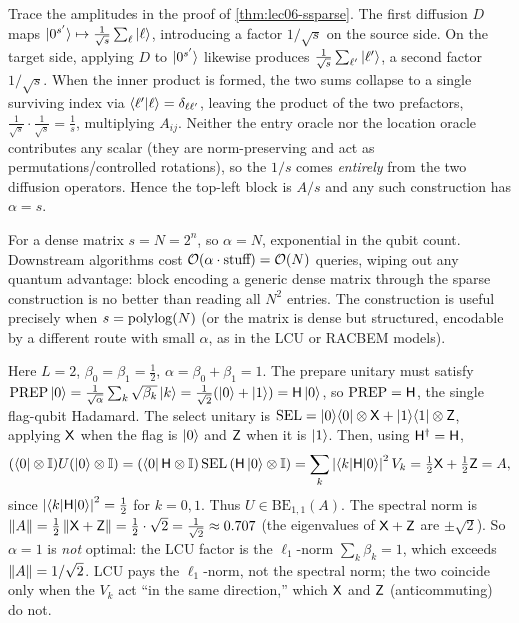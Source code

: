 \begin{solution}
Trace the amplitudes in the proof of \cref{thm:lec06-ssparse}. The first diffusion
$D$ maps $\ket{0^{s'}}\mapsto\frac{1}{\sqrt s}\sum_\ell\ket{\ell}$, introducing a
factor $1/\sqrt s$ on the source side. On the target side, applying $D$ to
$\ket{0^{s'}}$ likewise produces $\frac{1}{\sqrt s}\sum_{\ell'}\ket{\ell'}$, a second
factor $1/\sqrt s$. When the inner product is formed, the two sums collapse to a
single surviving index via $\braket{\ell'|\ell}=\delta_{\ell\ell'}$, leaving the
product of the two prefactors, $\frac{1}{\sqrt s}\cdot\frac{1}{\sqrt s}=\frac1s$,
multiplying $A_{ij}$. Neither the entry oracle nor the location oracle contributes any
scalar (they are norm-preserving and act as permutations/controlled rotations), so the
$1/s$ comes \emph{entirely} from the two diffusion operators. Hence the top-left block
is $A/s$ and any such construction has $\alpha=s$.

For a dense matrix $s=N=2^n$, so $\alpha=N$, exponential in the qubit count.
Downstream algorithms cost $\mathcal{O}(\alpha\cdot\text{stuff})=\mathcal{O}(N)$ queries, wiping
out any quantum advantage: block encoding a generic dense matrix through the sparse
construction is no better than reading all $N^2$ entries. The construction is useful
precisely when $s=\operatorname{polylog}(N)$ (or the matrix is dense but structured, encodable by a
different route with small $\alpha$, as in the LCU or RACBEM models).
\end{solution}

\begin{solution}
Here $L=2$, $\beta_0=\beta_1=\tfrac12$, $\alpha=\beta_0+\beta_1=1$. The prepare
unitary must satisfy
$\mathrm{PREP}\ket0=\frac1{\sqrt\alpha}\sum_k\sqrt{\beta_k}\ket k
=\tfrac1{\sqrt2}(\ket0+\ket1)=\mathsf{H}\ket0$, so $\mathrm{PREP}=\mathsf{H}$, the single
flag-qubit Hadamard. The select unitary is
$\mathrm{SEL}=\ket{0}\!\bra{0}\otimes\mathsf{X}+\ket{1}\!\bra{1}\otimes\mathsf{Z}$, applying $\mathsf{X}$ when the
flag is $\ket0$ and $\mathsf{Z}$ when it is $\ket1$. Then, using $\mathsf{H}^{\dagger}=\mathsf{H}$,
\[
  (\bra0\otimes\mathbb{I})U(\ket0\otimes\mathbb{I})
  =(\bra0\mathsf{H}\otimes\mathbb{I})\,\mathrm{SEL}\,(\mathsf{H}\ket0\otimes\mathbb{I})
  =\sum_k\left\lvert \braket{k|\mathsf{H}|0} \right\rvert^2 V_k
  =\tfrac12\mathsf{X}+\tfrac12\mathsf{Z}=A,
\]
since $\left\lvert \braket{k|\mathsf{H}|0} \right\rvert^2=\tfrac12$ for $k=0,1$. Thus
$U\in\mathrm{BE}_{1,1}(A)$. The spectral norm is
$\left\lVert A \right\rVert=\tfrac12\left\lVert \mathsf{X}+\mathsf{Z} \right\rVert=\tfrac12\cdot\sqrt2=\tfrac1{\sqrt2}\approx0.707$
(the eigenvalues of $\mathsf{X}+\mathsf{Z}$ are $\pm\sqrt2$). So $\alpha=1$ is \emph{not}
optimal: the LCU factor is the $\ell_1$-norm $\sum_k\beta_k=1$, which exceeds
$\left\lVert A \right\rVert=1/\sqrt2$. LCU pays the $\ell_1$-norm, not the spectral norm; the two
coincide only when the $V_k$ act ``in the same direction,'' which $\mathsf{X}$ and
$\mathsf{Z}$ (anticommuting) do not.
\end{solution}

